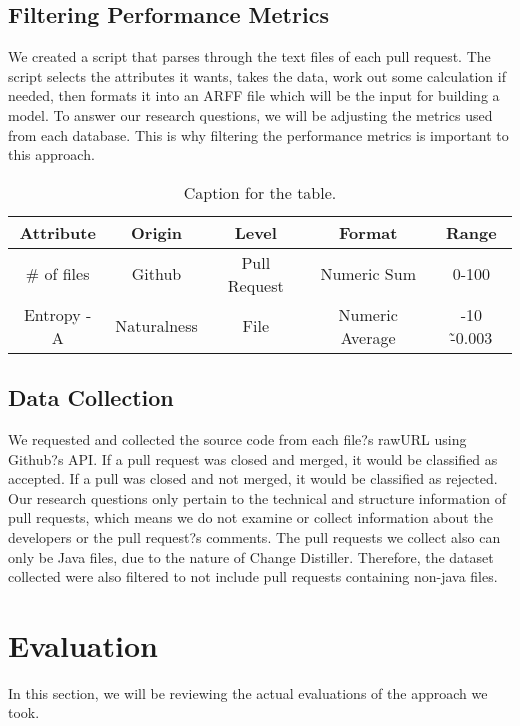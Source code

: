 \documentclass[10pt, conference]{IEEEtran}
\begin{document}
\subsection{Filtering Performance Metrics}
We created a script that parses through the text files of each pull request. The script selects the attributes it wants, takes the data, work out some calculation if needed, then formats it into an ARFF file which will be the input for building a model. To answer our research questions, we will be adjusting the metrics used from each database. This is why filtering the performance metrics is important to this approach.

\begin{table}[h!]
  \centering
  \caption{Caption for the table.}
  \label{tab:table1}
  \begin{tabular}{|c|c|c|c|c|}
    \hline
    \textbf {Attribute} & \textbf{Origin} & \textbf{Level} & \textbf{Format} & \textbf{Range}\\ %
    \hline
    \# of files & Github & Pull Request & Numeric Sum & 0-100 \\ %
    \hline
    Entropy - A & Naturalness & File & Numeric Average & -10 \~ -0.003\\
    \hline
  \end{tabular}
\end{table}

\subsection{Data Collection}
We requested and collected the source code from each file?s rawURL using Github?s API. If a pull request was closed and merged, it would be classified as accepted. If a pull was closed and not merged, it would be classified as rejected. Our research questions only pertain to the technical and structure information of pull requests, which means we do not examine or collect information about the developers or the pull request?s comments. The pull requests we collect also can only be Java files, due to the nature of Change Distiller. Therefore, the dataset collected were also filtered to not include pull requests containing non-java files.

\section{Evaluation}
In this section, we will be reviewing the actual evaluations of the approach we took.
\end{document}

